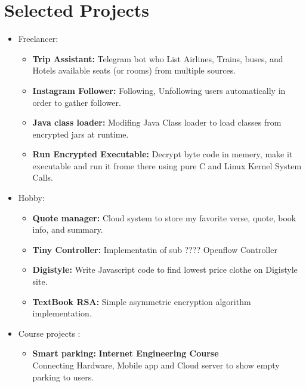 \documentclass[a4paper,10pt]{article} %
\begin{document}
\color{blue}
\section{Selected Projects}
\color{Black}
\begin{itemize}
	\item \textcolor{blue(ryb)}{Freelancer}:
		\begin{itemize}
			\item 
				\textbf {Trip Assistant:} Telegram bot who List Airlines, Trains, buses, and Hotels available seats (or rooms) from multiple sources.
			\item
				\textbf {Instagram Follower:} Following, Unfollowing users automatically in order to gather follower.
			\item
				\textbf{Java class loader:} Modifing Java Class loader to load classes from encrypted jars at runtime.
			\item
				\textbf{Run Encrypted Executable:} Decrypt byte code in memery, make it executable and run it frome there using pure C and Linux Kernel System Calls. \\
			
		\end{itemize}
	
	\item \textcolor{blue(ryb)}{Hobby}:
		\begin{itemize}
			\item
			\textbf {Quote manager:} Cloud system to store my favorite verse, quote, book info, and summary.
			
			\item 
				\textbf{Tiny Controller:} Implementatin of sub  ???? Openflow Controller
							
			\item 
				\textbf{Digistyle:} Write Javascript code to find lowest price clothe on Digistyle site.
				
			\item 
				\textbf{TextBook RSA:} Simple asymmetric encryption algorithm implementation. \\
			
		\end{itemize}
	
	\item \textcolor{blue(ryb)}{Course projects} :
	\begin{itemize}
		\item
			\textbf{Smart parking:}  \hfill \textbf {Internet Engineering Course} \\
			Connecting Hardware, Mobile app and Cloud server to show empty parking to users. 
		

\end{itemize}
\end{itemize}
\end{document}
